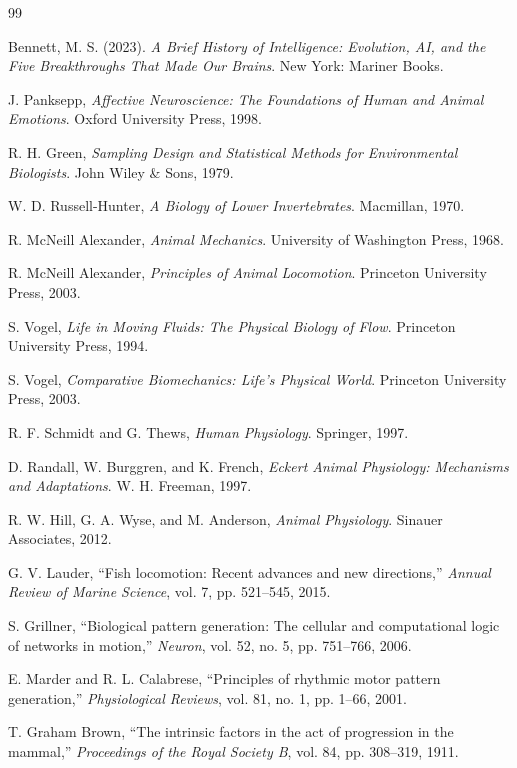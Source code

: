 \documentclass[11pt,oneside]{book}
\begin{document}
\begin{thebibliography}{99}

Bennett, M. S. (2023).
\textit{A Brief History of Intelligence: Evolution, AI, and the Five Breakthroughs That Made Our Brains}.
New York: Mariner Books.

J. Panksepp,
\textit{Affective Neuroscience: The Foundations of Human and Animal Emotions}.
Oxford University Press, 1998.

R. H. Green,
\textit{Sampling Design and Statistical Methods for Environmental Biologists}.
John Wiley \& Sons, 1979.

W. D. Russell-Hunter,
\textit{A Biology of Lower Invertebrates}.
Macmillan, 1970.

R. McNeill Alexander,
\textit{Animal Mechanics}.
University of Washington Press, 1968.

R. McNeill Alexander,
\textit{Principles of Animal Locomotion}.
Princeton University Press, 2003.

S. Vogel,
\textit{Life in Moving Fluids: The Physical Biology of Flow}.
Princeton University Press, 1994.

S. Vogel,
\textit{Comparative Biomechanics: Life’s Physical World}.
Princeton University Press, 2003.

R. F. Schmidt and G. Thews,
\textit{Human Physiology}.
Springer, 1997.

D. Randall, W. Burggren, and K. French,
\textit{Eckert Animal Physiology: Mechanisms and Adaptations}.
W. H. Freeman, 1997.

R. W. Hill, G. A. Wyse, and M. Anderson,
\textit{Animal Physiology}.
Sinauer Associates, 2012.

G. V. Lauder,
“Fish locomotion: Recent advances and new directions,”
\textit{Annual Review of Marine Science}, vol. 7, pp. 521–545, 2015.

S. Grillner,
“Biological pattern generation: The cellular and computational logic of networks in motion,”
\textit{Neuron}, vol. 52, no. 5, pp. 751–766, 2006.

E. Marder and R. L. Calabrese,
“Principles of rhythmic motor pattern generation,”
\textit{Physiological Reviews}, vol. 81, no. 1, pp. 1–66, 2001.

T. Graham Brown,
“The intrinsic factors in the act of progression in the mammal,”
\textit{Proceedings of the Royal Society B}, vol. 84, pp. 308–319, 1911.


\end{thebibliography}
\end{document}
